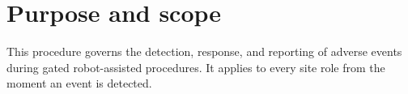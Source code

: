 \section{Purpose and scope}
\label{sec:a}

This procedure governs the detection, response, and reporting of adverse events during gated robot-assisted procedures. It applies to every site role from the moment an event is detected.
